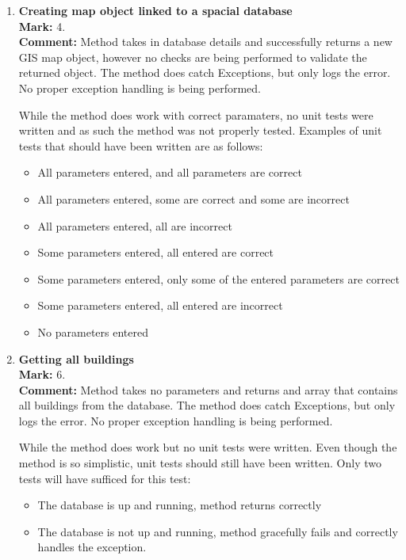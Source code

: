 \documentclass[12pt]{article}
\begin{document}
	\begin{enumerate}
		\item \textbf {Creating map object linked to a spacial database}\\
		\textbf{Mark: }
		4.\\
		\textbf{Comment: }
		Method takes in database details and successfully returns a new GIS map object, however no checks are being performed to validate the returned object.
		The method does catch Exceptions, but only logs the error. No proper exception handling is being performed.
		
		While the method does work with correct paramaters, no unit tests were written and as such the method was not properly tested.
		Examples of unit tests that should have been written are as follows: 
		\begin{itemize}
			\item All parameters entered, and all parameters are correct
			\item All parameters entered, some are correct and some are incorrect
			\item All parameters entered, all are incorrect
			\item Some parameters entered, all entered are correct
			\item Some parameters entered, only some of the entered parameters are correct
			\item Some parameters entered, all entered are incorrect
			\item No parameters entered
		\end{itemize}	
			
		\item \textbf {Getting all buildings}\\
		\textbf{Mark: }
		6.\\
		\textbf{Comment: }
		Method takes no parameters and returns and array that contains all buildings from the database.
		The method does catch Exceptions, but only logs the error. No proper exception handling is being performed.
		
		While the method does work but no unit tests were written. Even though the method is so simplistic, unit tests should still have been written. Only two tests will have sufficed for this test:  
		\begin{itemize}
			\item The database is up and running, method returns correctly
			\item The database is not up and running, method gracefully fails and correctly handles the exception.
		\end{itemize}	
		

\end{enumerate}
\end{document}
